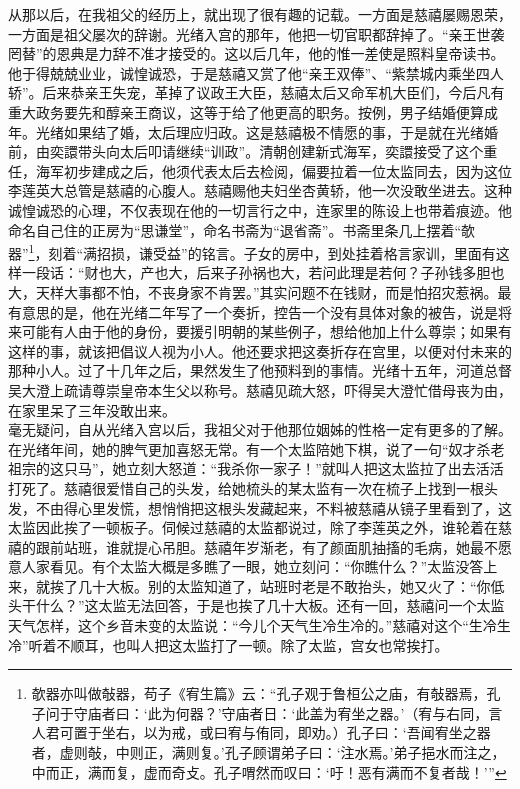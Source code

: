   从那以后，在我祖父的经历上，就出现了很有趣的记载。一方面是慈禧屡赐恩荣，一方面是祖父屡次的辞谢。光绪入宫的那年，他把一切官职都辞掉了。“亲王世袭罔替”的恩典是力辞不准才接受的。这以后几年，他的惟一差使是照料皇帝读书。他于得兢兢业业，诚惶诚恐，于是慈禧又赏了他“亲王双俸”、“紫禁城内乘坐四人轿”。后来恭亲王失宠，革掉了议政王大臣，慈禧太后又命军机大臣们，今后凡有重大政务要先和醇亲王商议，这等于给了他更高的职务。按例，男子结婚便算成年。光绪如果结了婚，太后理应归政。这是慈禧极不情愿的事，于是就在光绪婚前，由奕譞带头向太后叩请继续“训政”。清朝创建新式海军，奕譞接受了这个重任，海军初步建成之后，他须代表太后去检阅，偏要拉着一位太监同去，因为这位李莲英大总管是慈禧的心腹人。慈禧赐他夫妇坐杏黄轿，他一次没敢坐进去。这种诚惶诚恐的心理，不仅表现在他的一切言行之中，连家里的陈设上也带着痕迹。他命名自己住的正房为“思谦堂”，命名书斋为“退省斋”。书斋里条几上摆着“欹器”\footnote{欹器亦叫做敧器，苟子《宥生篇》云：“孔子观于鲁桓公之庙，有敧器焉，孔子问于守庙者曰：‘此为何器？’守庙者日：‘此盖为宥坐之器。’（宥与右同，言人君可置于坐右，以为戒，或曰宥与侑同，即劝。）孔子曰：‘吾闻宥坐之器者，虚则敧，中则正，满则复。’孔子顾谓弟子曰：‘注水焉。’弟子挹水而注之，中而正，满而复，虚而奇攴。孔子喟然而叹曰：‘吁！恶有满而不复者哉！’”}，刻着“满招损，谦受益”的铭言。子女的房中，到处挂着格言家训，里面有这样一段话：“财也大，产也大，后来子孙祸也大，若问此理是若何？子孙钱多胆也大，天样大事都不怕，不丧身家不肯罢。”其实问题不在钱财，而是怕招灾惹祸。最有意思的是，他在光绪二年写了一个奏折，控告一个没有具体对象的被告，说是将来可能有人由于他的身份，要援引明朝的某些例子，想给他加上什么尊崇；如果有这样的事，就该把倡议人视为小人。他还要求把这奏折存在宫里，以便对付未来的那种小人。过了十几年之后，果然发生了他预料到的事情。光绪十五年，河道总督吴大澄上疏请尊崇皇帝本生父以称号。慈禧见疏大怒，吓得吴大澄忙借母丧为由，在家里呆了三年没敢出来。\\

  毫无疑问，自从光绪入宫以后，我祖父对于他那位姻姊的性格一定有更多的了解。在光绪年间，她的脾气更加喜怒无常。有一个太监陪她下棋，说了一句“奴才杀老祖宗的这只马”，她立刻大怒道：“我杀你一家子！”就叫人把这太监拉了出去活活打死了。慈禧很爱惜自己的头发，给她梳头的某太监有一次在梳子上找到一根头发，不由得心里发慌，想悄悄把这根头发藏起来，不料被慈禧从镜子里看到了，这太监因此挨了一顿板子。伺候过慈禧的太监都说过，除了李莲英之外，谁轮着在慈禧的跟前站班，谁就提心吊胆。慈禧年岁渐老，有了颜面肌抽搐的毛病，她最不愿意人家看见。有个太监大概是多瞧了一眼，她立刻问：“你瞧什么？”太监没答上来，就挨了几十大板。别的太监知道了，站班时老是不敢抬头，她又火了：“你低头干什么？”这太监无法回答，于是也挨了几十大板。还有一回，慈禧问一个太监天气怎样，这个乡音未变的太监说：“今儿个天气生冷生冷的。”慈禧对这个“生冷生冷”听着不顺耳，也叫人把这太监打了一顿。除了太监，宫女也常挨打。\\

